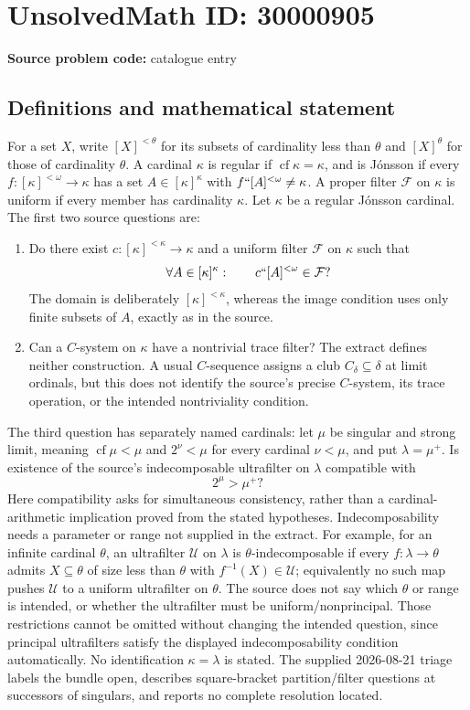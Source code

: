 \documentclass[11pt]{article}
\begin{document}
\section*{UnsolvedMath ID: 30000905}
\textbf{Source problem code:} catalogue entry
\subsection{Definitions and mathematical statement}
For a set $X$, write $[X]^{<\theta}$ for its subsets of cardinality less than $\theta$ and $[X]^\theta$ for those of cardinality $\theta$. A cardinal $\kappa$ is regular if $\operatorname{cf}\kappa=\kappa$, and is J\'onsson if every $f:[\kappa]^{<\omega}\to\kappa$ has a set $A\in[\kappa]^\kappa$ with $f``[A]^{<\omega}\ne\kappa$. A proper filter $\mathcal F$ on $\kappa$ is uniform if every member has cardinality $\kappa$. Let $\kappa$ be a regular J\'onsson cardinal. The first two source questions are: \begin{enumerate}\item Do there exist $c:[\kappa]^{<\kappa}\to\kappa$ and a uniform filter $\mathcal F$ on $\kappa$ such that \[\forall A\in[\kappa]^\kappa:\qquad c``[A]^{<\omega}\in\mathcal F?\] The domain is deliberately $[\kappa]^{<\kappa}$, whereas the image condition uses only finite subsets of $A$, exactly as in the source.\item Can a $C$-system on $\kappa$ have a nontrivial trace filter? The extract defines neither construction. A usual $C$-sequence assigns a club $C_\delta\subseteq\delta$ at limit ordinals, but this does not identify the source's precise $C$-system, its trace operation, or the intended nontriviality condition.\end{enumerate} The third question has separately named cardinals: let $\mu$ be singular and strong limit, meaning $\operatorname{cf}\mu<\mu$ and $2^\nu<\mu$ for every cardinal $\nu<\mu$, and put $\lambda=\mu^+$. Is existence of the source's indecomposable ultrafilter on $\lambda$ compatible with \[2^\mu>\mu^+?\] Here compatibility asks for simultaneous consistency, rather than a cardinal-arithmetic implication proved from the stated hypotheses. Indecomposability needs a parameter or range not supplied in the extract. For example, for an infinite cardinal $\theta$, an ultrafilter $\mathcal U$ on $\lambda$ is $\theta$-indecomposable if every $f:\lambda\to\theta$ admits $X\subseteq\theta$ of size less than $\theta$ with $f^{-1}(X)\in\mathcal U$; equivalently no such map pushes $\mathcal U$ to a uniform ultrafilter on $\theta$. The source does not say which $\theta$ or range is intended, or whether the ultrafilter must be uniform/nonprincipal. Those restrictions cannot be omitted without changing the intended question, since principal ultrafilters satisfy the displayed indecomposability condition automatically. No identification $\kappa=\lambda$ is stated. The supplied 2026-08-21 triage labels the bundle open, describes square-bracket partition/filter questions at successors of singulars, and reports no complete resolution located.
\end{document}

